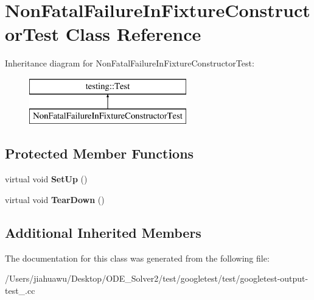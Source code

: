 \hypertarget{class_non_fatal_failure_in_fixture_constructor_test}{}\section{Non\+Fatal\+Failure\+In\+Fixture\+Constructor\+Test Class Reference}
\label{class_non_fatal_failure_in_fixture_constructor_test}
Inheritance diagram for Non\+Fatal\+Failure\+In\+Fixture\+Constructor\+Test\+:\begin{figure}[H]
\begin{center}
\leavevmode
\includegraphics[height=2.000000cm]{class_non_fatal_failure_in_fixture_constructor_test}
\end{center}
\end{figure}
\subsection*{Protected Member Functions}
\begin{DoxyCompactItemize}
\item 
\mbox{\label{class_non_fatal_failure_in_fixture_constructor_test_a7d951f8fbf7b2ac5046be8d8ee7b03d3}} 
virtual void {\bfseries Set\+Up} ()
\item 
\mbox{\label{class_non_fatal_failure_in_fixture_constructor_test_ab76d79c346d9a378d625fde5739e8ad6}} 
virtual void {\bfseries Tear\+Down} ()
\end{DoxyCompactItemize}
\subsection*{Additional Inherited Members}


The documentation for this class was generated from the following file\+:\begin{DoxyCompactItemize}
\item 
/\+Users/jiahuawu/\+Desktop/\+O\+D\+E\+\_\+\+Solver2/test/googletest/test/googletest-\/output-\/test\+\_\+.\+cc\end{DoxyCompactItemize}
